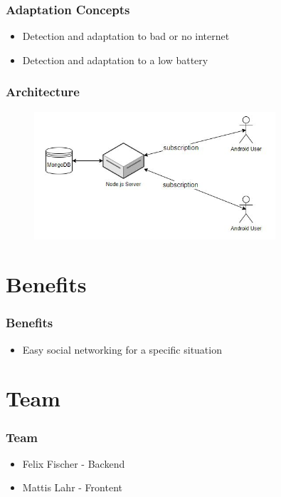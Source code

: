 \documentclass[aspectratio=169]{beamer}
\begin{document}
	\begin{frame}
		\frametitle{Adaptation Concepts}
		\begin{itemize}
			\item Detection and adaptation to bad or no internet
			\item Detection and adaptation to a low battery
		\end{itemize}
	\end{frame}

	\begin{frame}
		\frametitle{Architecture}
		 \begin{figure}
			\centering
			\includegraphics[width=0.8\textwidth]{media/architecture.jpg}
		\end{figure}
	\end{frame}

\section{Benefits}

	\begin{frame}
		\frametitle{Benefits}
		\begin{itemize}
			\item Easy social networking for a specific situation
		\end{itemize}
	\end{frame}

\section{Team}

	\begin{frame}
		\frametitle{Team}
		\begin{itemize}
			\item Felix Fischer - Backend 
			\item Mattis Lahr - Frontent
		\end{itemize}
	\end{frame}
\end{document}
